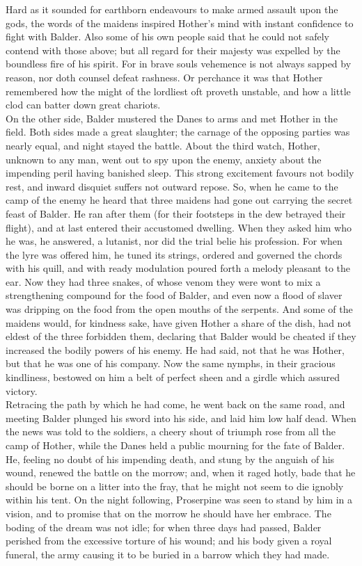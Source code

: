 \documentclass[10pt,a4paper]{report}
\begin{document}
Hard as it sounded for earthborn endeavours to make armed assault upon the gods, the words of the maidens inspired Hother's mind with instant confidence to fight with Balder. Also some of his own people said that he could not safely contend with those above; but all regard for their majesty was expelled by the boundless fire of his spirit. For in brave souls vehemence is not always sapped by reason, nor doth counsel defeat rashness. Or perchance it was that Hother remembered how the might of the lordliest oft proveth unstable, and how a little clod can batter down great chariots.\\

On the other side, Balder mustered the Danes to arms and met Hother in the field. Both sides made a great slaughter; the carnage of the opposing parties was nearly equal, and night stayed the battle. About the third watch, Hother, unknown to any man, went out to spy upon the enemy, anxiety about the impending peril having banished sleep. This strong excitement favours not bodily rest, and inward disquiet suffers not outward repose. So, when he came to the camp of the enemy he heard that three maidens had gone out carrying the secret feast of Balder. He ran after them (for their footsteps in the dew betrayed their flight), and at last entered their accustomed dwelling. When they asked him who he was, he answered, a lutanist, nor did the trial belie his profession. For when the lyre was offered him, he tuned its strings, ordered and governed the chords with his quill, and with ready modulation poured forth a melody pleasant to the ear. Now they had three snakes, of whose venom they were wont to mix a strengthening compound for the food of Balder, and even now a flood of slaver was dripping on the food from the open mouths of the serpents. And some of the maidens would, for kindness sake, have given Hother a share of the dish, had not eldest of the three forbidden them, declaring that Balder would be cheated if they increased the bodily powers of his enemy. He had said, not that he was Hother, but that he was one of his company. Now the same nymphs, in their gracious kindliness, bestowed on him a belt of perfect sheen and a girdle which assured victory.\\

Retracing the path by which he had come, he went back on the same road, and meeting Balder plunged his sword into his side, and laid him low half dead. When the news was told to the soldiers, a cheery shout of triumph rose from all the camp of Hother, while the Danes held a public mourning for the fate of Balder. He, feeling no doubt of his impending death, and stung by the anguish of his wound, renewed the battle on the morrow; and, when it raged hotly, bade that he should be borne on a litter into the fray, that he might not seem to die ignobly within his tent. On the night following, Proserpine was seen to stand by him in a vision, and to promise that on the morrow he should have her embrace. The boding of the dream was not idle; for when three days had passed, Balder perished from the excessive torture of his wound; and his body given a royal funeral, the army causing it to be buried in a barrow which they had made.\\
\end{document}
